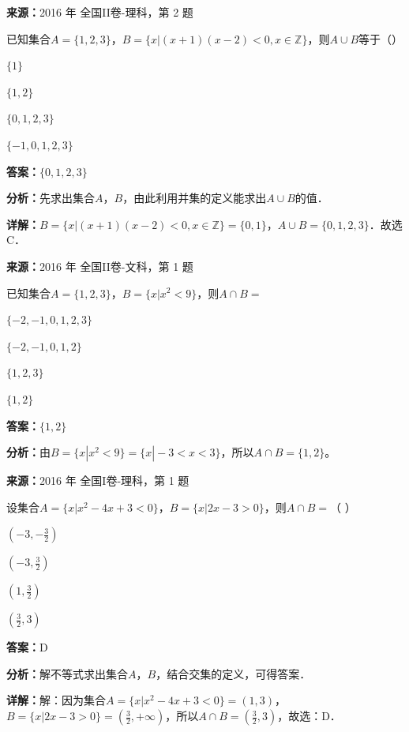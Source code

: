 \begin{question}[points=5]
\textbf{来源：}2016 年 全国II卷-理科，第 2 题\par
已知集合$A=\{1,2,3\}$，$B=\{x|(x+1)(x-2)<0,x\in\mathbb{Z}\}$，则$A\cup B$等于（\quad）
\begin{choices}
  \item $\{1\}$
  \item $\{1,2\}$
  \item $\{0,1,2,3\}$
  \item $\{-1,0,1,2,3\}$
\end{choices}
\begin{solution}
\textbf{答案：}$\{0,1,2,3\}$

\textbf{分析：}先求出集合$A$，$B$，由此利用并集的定义能求出$A\cup B$的值．

\textbf{详解：}$B=\{x|(x+1)(x-2)<0,x\in\mathbb{Z}\}=\{0,1\}$，$A\cup B=\{0,1,2,3\}$．故选C．
\end{solution}
\end{question}

\begin{question}[points=5]
\textbf{来源：}2016 年 全国II卷-文科，第 1 题\par
已知集合$A=\{1,2,3\}$，$B=\{x|x^2<9\}$，则$A\cap B=$
\begin{choices}
  \item $\{-2,-1,0,1,2,3\}$
  \item $\{-2,-1,0,1,2\}$
  \item $\{1,2,3\}$
  \item $\{1,2\}$
\end{choices}
\begin{solution}
\textbf{答案：}$\{1,2\}$

\textbf{分析：}由$B=\{x|x^2<9\}=\{x|-3<x<3\}$，所以$A\cap B=\{1,2\}$。
\end{solution}
\end{question}

\begin{question}[points=5]
\textbf{来源：}2016 年 全国I卷-理科，第 1 题\par
设集合$A=\{x|x^2-4x+3<0\}$，$B=\{x|2x-3>0\}$，则$A\cap B=$（ ）
\begin{choices}
  \item $(-3,-\frac{3}{2})$
  \item $(-3,\frac{3}{2})$
  \item $(1,\frac{3}{2})$
  \item $(\frac{3}{2},3)$
\end{choices}
\begin{solution}
\textbf{答案：}D

\textbf{分析：}解不等式求出集合$A$，$B$，结合交集的定义，可得答案．

\textbf{详解：}解：因为集合$A=\{x|x^2-4x+3<0\}=(1,3)$，$B=\{x|2x-3>0\}=(\frac{3}{2},+\infty)$，所以$A\cap B=(\frac{3}{2},3)$，故选：D．
\end{solution}
\end{question}

